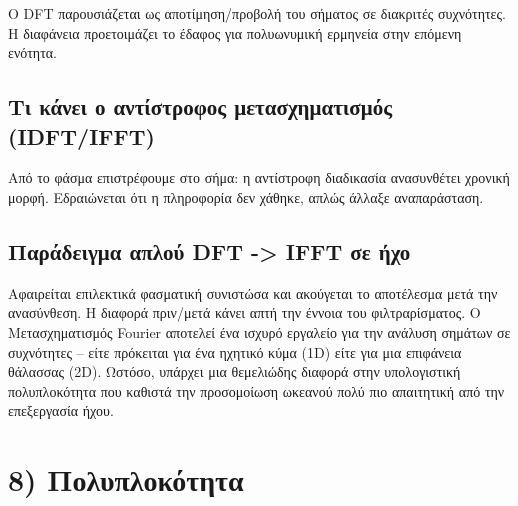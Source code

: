 \documentclass[
  a4paper,
  11pt,
]{article}
\begin{document}
Ο DFT παρουσιάζεται ως αποτίμηση/προβολή του σήματος σε διακριτές
συχνότητες. Η διαφάνεια προετοιμάζει το έδαφος για πολυωνυμική ερμηνεία
στην επόμενη ενότητα.

\subsection{Τι κάνει ο αντίστροφος μετασχηματισμός
(IDFT/IFFT)}\label{ux3c4ux3b9-ux3baux3acux3bdux3b5ux3b9-ux3bf-ux3b1ux3bdux3c4ux3afux3c3ux3c4ux3c1ux3bfux3c6ux3bfux3c2-ux3bcux3b5ux3c4ux3b1ux3c3ux3c7ux3b7ux3bcux3b1ux3c4ux3b9ux3c3ux3bcux3ccux3c2-idftifft}

Από το φάσμα επιστρέφουμε στο σήμα: η αντίστροφη διαδικασία ανασυνθέτει
χρονική μορφή. Εδραιώνεται ότι η πληροφορία δεν χάθηκε, απλώς άλλαξε
αναπαράσταση.

\subsection{Παράδειγμα απλού DFT -\textgreater{} IFFT σε
ήχο}\label{ux3c0ux3b1ux3c1ux3acux3b4ux3b5ux3b9ux3b3ux3bcux3b1-ux3b1ux3c0ux3bbux3bfux3cd-dft---ifft-ux3c3ux3b5-ux3aeux3c7ux3bf}

Αφαιρείται επιλεκτικά φασματική συνιστώσα και ακούγεται το αποτέλεσμα
μετά την ανασύνθεση. Η διαφορά πριν/μετά κάνει απτή την έννοια του
φιλτραρίσματος. Ο Μετασχηματισμός Fourier αποτελεί ένα ισχυρό εργαλείο
για την ανάλυση σημάτων σε συχνότητες -- είτε πρόκειται για ένα ηχητικό
κύμα (1D) είτε για μια επιφάνεια θάλασσας (2D). Ωστόσο, υπάρχει μια
θεμελιώδης διαφορά στην υπολογιστική πολυπλοκότητα που καθιστά την
προσομοίωση ωκεανού πολύ πιο απαιτητική από την επεξεργασία ήχου.

\section{8)
Πολυπλοκότητα}\label{ux3c0ux3bfux3bbux3c5ux3c0ux3bbux3bfux3baux3ccux3c4ux3b7ux3c4ux3b1}
\end{document}

